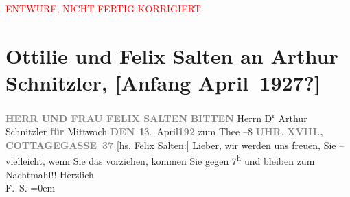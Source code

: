 
\begin{center}
            \textcolor{red}{ENTWURF, NICHT FERTIG KORRIGIERT}
                      \end{center}
            
         \renewcommand{\erwaehnteOrte}{Orte: Cottagegasse, Wien}
         \renewcommand{\erwaehnteWerke}{}
               \section[Ottilie und Felix Salten an Arthur Schnitzler, {[}Anfang April 1927?{]}]{ Ottilie und Felix Salten an Arthur Schnitzler, {[}Anfang
               April 1927?{]}}\nopagebreak{}\rehead{ }\begin{ledgroupsized}[t]{13cm}\normalsize\beginnumbering \toendnotes[C]{\smallbreak\pagebreak[2]} 
\toendnotes[C]{\smallbreak}\pstart
           \noindent{}\centering{}{\pb}\textcolor{gray}{\textbf{HERR UND FRAU FELIX
                        SALTEN}}\pend
           \pstart
           \noindent{}\textcolor{gray}{\textbf{BITTEN}} Herrn D\textsuperscript{r}\pend
           \pstart
           Arthur Schnitzler\pend
           \pstart
           \textcolor{gray}{\textbf{für}}{ }Mittwoch \textcolor{gray}{\textbf{DEN}} 13. April\textcolor{gray}{\textbf{192}}\pend
           \pstart
           zum Thee\pend
           –8 \textcolor{gray}{\textbf{UHR}}.\pend
           \pstart
           \textcolor{gray}{\textbf{XVIII., COTTAGEGASSE 37}}\hfill \textcolor{gray}{\textbf{\label{K_L03581-1v}\label{K_L03581-1h}}}\pend
           \pstart
           {[}hs. Felix Salten:{]} Lieber, wir werden uns freuen, Sie
                  \label{K_L03581-2v}\label{K_L03581-2h} – vielleicht, wenn Sie das vorziehen, kommen Sie gegen 7\textsuperscript{h} und bleiben zum Nachtmahl!!\pend
           \pstart
           Herzlich {\\[\baselineskip]}\spacefill\mbox{F. S.}\pend
           \leftskip=0em{}
         
         \endnumbering{}\end{ledgroupsized}  \newcommand{\dateiname}{L03581}\newcommand{\titel}{Ottilie und Felix Salten an Arthur Schnitzler, [Anfang April 1927?]}\newcommand{\editorInnen}{Martin Anton Müller und Laura Untner}
      